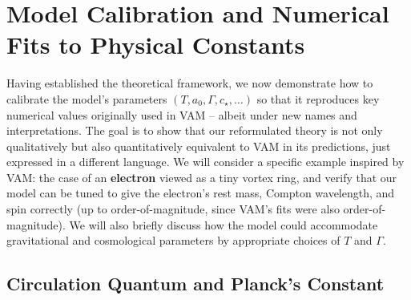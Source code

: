 \documentclass[12pt]{article}
\begin{document}
\section{Model Calibration and Numerical Fits to Physical Constants}
\label{sec:calibration}

Having established the theoretical framework, we now demonstrate how to calibrate the model’s parameters $(T, a_0, \Gamma, c_\star, \ldots)$ so that it reproduces key numerical values originally used in VAM -- albeit under new names and interpretations. The goal is to show that our reformulated theory is not only qualitatively but also quantitatively equivalent to VAM in its predictions, just expressed in a different language. We will consider a specific example inspired by VAM: the case of an \textbf{electron} viewed as a tiny vortex ring, and verify that our model can be tuned to give the electron’s rest mass, Compton wavelength, and spin correctly (up to order-of-magnitude, since VAM’s fits were also order-of-magnitude). We will also briefly discuss how the model could accommodate gravitational and cosmological parameters by appropriate choices of $T$ and $\Gamma$.

\subsection{Circulation Quantum and Planck’s Constant}
\end{document}
